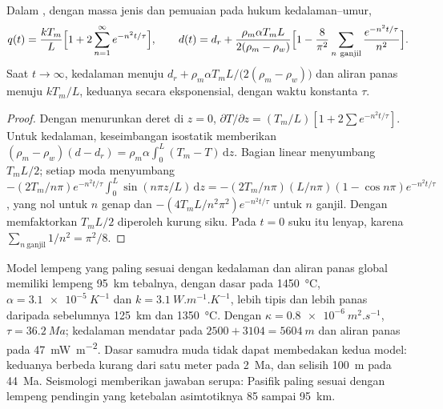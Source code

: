 \begin{proposition}\label{prop:b3:lithosphere-thermal-models:plate-depth}
Dalam , dengan massa jenis dan pemuaian pada hukum
kedalaman--umur,
\[
  q(t) = \frac{kT_m}{L}\Bigl[1 + 2\sum_{n=1}^\infty e^{-n^2t/\tau}\Bigr],\qquad
  d(t) = d_r + \frac{\rho_m\alpha T_mL}{2(\rho_m - \rho_w)}
  \Bigl[1 - \frac{8}{\pi^2}\sum_{n\ \text{ganjil}}\frac{e^{-n^2t/\tau}}{n^2}\Bigr].
\]
Saat $t \to \infty$, kedalaman menuju $d_r + \rho_m\alpha T_mL/\bigl(2(\rho_m -
\rho_w)\bigr)$ dan aliran panas menuju $kT_m/L$, keduanya secara eksponensial, dengan waktu
konstanta $\tau$.
\end{proposition}

\begin{proof}
Dengan menurunkan deret di $z = 0$, $\partial T/\partial z = (T_m/L)[1 +
2\sum e^{-n^2t/\tau}]$. Untuk kedalaman, keseimbangan isostatik memberikan $(\rho_m -
\rho_w)(d - d_r) = \rho_m\alpha\int_0^L(T_m - T)\,\mathrm dz$. Bagian linear
menyumbang $T_mL/2$; setiap moda menyumbang $-(2T_m/n\pi)e^{-n^2t/\tau}
\int_0^L\sin(n\pi z/L)\,\mathrm dz = -(2T_m/n\pi)(L/n\pi)(1 - \cos n\pi)
e^{-n^2t/\tau}$, yang nol untuk $n$ genap dan $-(4T_mL/n^2\pi^2)
e^{-n^2t/\tau}$ untuk $n$ ganjil. Dengan memfaktorkan $T_mL/2$ diperoleh kurung siku. Pada $t = 0$
suku itu lenyap, karena $\sum_{n\ \text{ganjil}}1/n^2 = \pi^2/8$.
\end{proof}

Model lempeng yang paling sesuai dengan kedalaman dan aliran panas global memiliki lempeng
\qty{95}{km} tebalnya, dengan dasar pada \qty{1450}{\celsius}, $\alpha =
\qty{3.1e-5}{K^{-1}}$ dan $k = \qty{3.1}{W.m^{-1}.K^{-1}}$, lebih tipis dan lebih panas
daripada sebelumnya \qty{125}{km} dan \qty{1350}{\celsius}. Dengan $\kappa =
\qty{0.8e-6}{m^2.s^{-1}}$, $\tau = \qty{36.2}{Ma}$; kedalaman mendatar pada
$2500 + 3104 = \qty{5604}{m}$ dan aliran panas pada \qty{47}{mW.m^{-2}}. Dasar
samudra muda tidak dapat membedakan kedua model: keduanya berbeda kurang dari satu meter pada
\qty{2}{Ma}, dan selisih \qty{100}{m} pada \qty{44}{Ma}. Seismologi memberikan
jawaban serupa:  Pasifik paling sesuai dengan lempeng pendingin yang
ketebalan asimtotiknya 85 sampai \qty{95}{km}.

